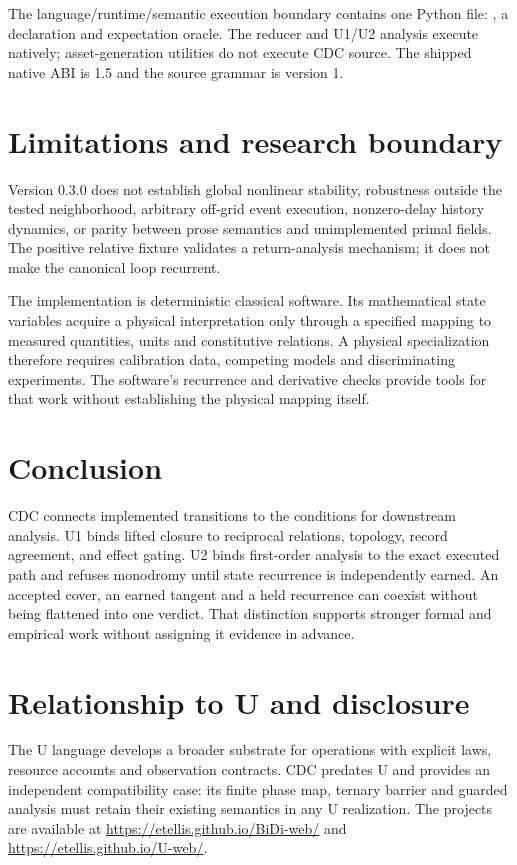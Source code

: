 \documentclass[11pt]{article}
\begin{document}
The language/runtime/semantic execution boundary contains one Python file:
, a declaration and expectation oracle. The reducer
and U1/U2 analysis execute natively; asset-generation utilities do not
execute CDC source. The shipped native ABI is 1.5 and the source grammar is
version 1.

\section{Limitations and research boundary}

Version 0.3.0 does not establish global nonlinear stability, robustness outside
the tested neighborhood, arbitrary off-grid event execution, nonzero-delay
history dynamics, or parity between prose semantics and unimplemented primal
fields. The positive relative fixture validates a return-analysis mechanism; it
does not make the canonical loop recurrent.

The implementation is deterministic classical software. Its mathematical
state variables acquire a physical interpretation only through a specified
mapping to measured quantities, units and constitutive relations. A physical
specialization therefore requires calibration data, competing models and
discriminating experiments. The software's recurrence and derivative checks
provide tools for that work without establishing the physical mapping itself.

\section{Conclusion}

CDC connects implemented transitions to the conditions for downstream analysis. U1
binds lifted closure to reciprocal relations, topology, record agreement, and
effect gating. U2 binds first-order analysis to the exact executed path and
refuses monodromy until state recurrence is independently earned. An accepted
cover, an earned tangent and a held recurrence can coexist without being
flattened into one verdict. That distinction supports stronger formal and
empirical work without assigning it evidence in advance.

\section*{Relationship to U and disclosure}
The U language develops a broader substrate for operations with explicit laws,
resource accounts and observation contracts. CDC predates U and provides an
independent compatibility case: its finite phase map, ternary barrier and
guarded analysis must retain their existing semantics in any U realization.
The projects are available at \url{https://etellis.github.io/BiDi-web/} and
\url{https://etellis.github.io/U-web/}.
\end{document}
